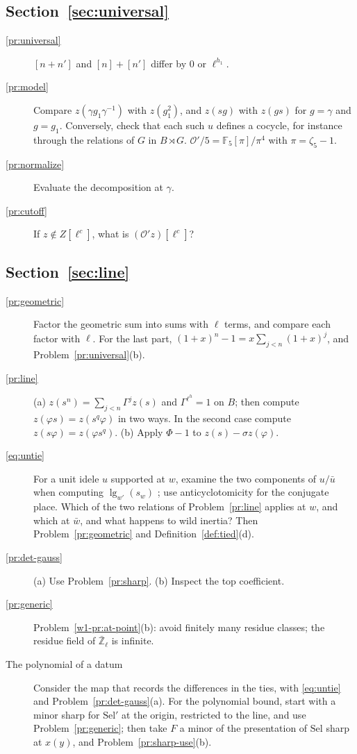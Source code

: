 \documentclass[reqno]{amsart}
\theoremstyle{definition}
\theoremstyle{plain}
\newcommand{\Zl}{\bar{\mathbb{Z}}_\ell}
\newcommand{\Sel}{\mathrm{Sel}}
\newcommand{\Oc}{\mathcal{O}}
\begin{document}
\subsection*{Section~\ref{sec:universal}}
\begin{description}
\item[\ref{pr:universal}] \([n + n']\) and \([n] + [n']\) differ by \(0\) or \(\ell^{h_1}\).
\item[\ref{pr:model}] Compare \(z(\gamma g_1 \gamma^{-1})\) with \(z(g_1^2)\), and \(z(sg)\) with \(z(gs)\) for \(g = \gamma\) and \(g = g_1\).  Conversely, check that each such \(u\) defines a cocycle, for instance through the relations of \(G\) in \(B \rtimes G\).  \(\Oc'/5 = \mathbb F_5[\pi]/\pi^4\) with \(\pi = \zeta_5 - 1\).
\item[\ref{pr:normalize}] Evaluate the decomposition at \(\gamma\).
\item[\ref{pr:cutoff}] If \(z \notin Z[\ell^c]\), what is \((\Oc' z)[\ell^c]\)?
\end{description}

\subsection*{Section~\ref{sec:line}}
\begin{description}
\item[\ref{pr:geometric}] Factor the geometric sum into sums with \(\ell\) terms, and compare each factor with \(\ell\).  For the last part, \((1 + x)^{n} - 1 = x \sum_{j < n} (1 + x)^j\), and Problem~\ref{pr:universal}(b).
\item[\ref{pr:line}] (a) \(z(s^n) = \sum_{j < n} \Gamma^j z(s)\) and \(\Gamma^{\ell^h} = 1\) on \(B\); then compute \(z(\varphi s) = z(s^q\varphi)\) in two ways.  In the second case compute \(z(s\varphi) = z(\varphi s^q)\).  (b) Apply \(\Phi - 1\) to \(z(s) - \sigma z(\varphi)\).
\item[\eqref{eq:untie}] For a unit idele \(u\) supported at \(w\), examine the two components of \(u/\bar u\) when computing \(\lg_{w'}(s_w)\) \cite[Ch.~VI]{Ne}; use anticyclotomicity for the conjugate place.  Which of the two relations of Problem~\ref{pr:line} applies at \(w\), and which at \(\bar w\), and what happens to wild inertia?  Then Problem~\ref{pr:geometric} and Definition~\ref{def:tied}(d).
\item[\ref{pr:det-gauss}] (a) Use Problem~\ref{pr:sharp}.  (b) Inspect the top coefficient.
\item[\ref{pr:generic}] Problem~\ref{w1-pr:at-point}(b): avoid finitely many residue classes; the residue field of \(\Zl\) is infinite.
\item[The polynomial of a datum] Consider the map that records the differences in the ties, with \eqref{eq:untie} and Problem~\ref{pr:det-gauss}(a).  For the polynomial bound, start with a minor sharp for \(\Sel'\) at the origin, restricted to the line, and use Problem~\ref{pr:generic}; then take \(F\) a minor of the presentation of \(\Sel\) sharp at \(x(y)\), and Problem~\ref{pr:sharp-use}(b).
\end{description}
\end{document}
